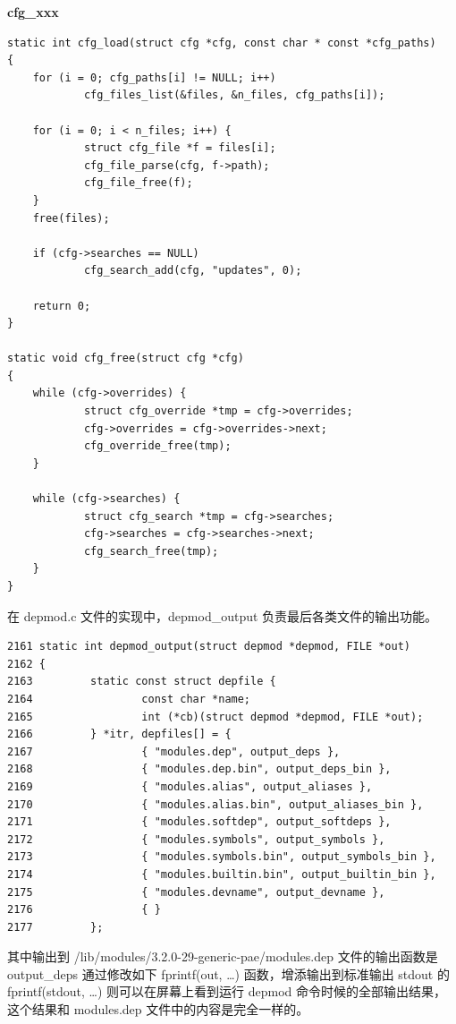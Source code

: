 \documentclass[11pt,a4paper]{article}
\begin{document}
\textbf{cfg\_xxx}

{\begin{shaded}\begin{verbatim}
static int cfg_load(struct cfg *cfg, const char * const *cfg_paths)
{
    for (i = 0; cfg_paths[i] != NULL; i++)
            cfg_files_list(&files, &n_files, cfg_paths[i]);

    for (i = 0; i < n_files; i++) {
            struct cfg_file *f = files[i];
            cfg_file_parse(cfg, f->path);
            cfg_file_free(f);
    }
    free(files);

    if (cfg->searches == NULL)
            cfg_search_add(cfg, "updates", 0);

    return 0;
}

static void cfg_free(struct cfg *cfg)
{
    while (cfg->overrides) {
            struct cfg_override *tmp = cfg->overrides;
            cfg->overrides = cfg->overrides->next;
            cfg_override_free(tmp);
    }

    while (cfg->searches) {
            struct cfg_search *tmp = cfg->searches;
            cfg->searches = cfg->searches->next;
            cfg_search_free(tmp);
    }
}
\end{verbatim}\end{shaded}}
在 depmod.c 文件的实现中，depmod\_output 负责最后各类文件的输出功能。

{\begin{shaded}\begin{verbatim}
2161 static int depmod_output(struct depmod *depmod, FILE *out)
2162 {
2163         static const struct depfile {
2164                 const char *name;
2165                 int (*cb)(struct depmod *depmod, FILE *out);
2166         } *itr, depfiles[] = {
2167                 { "modules.dep", output_deps },
2168                 { "modules.dep.bin", output_deps_bin },
2169                 { "modules.alias", output_aliases },
2170                 { "modules.alias.bin", output_aliases_bin },
2171                 { "modules.softdep", output_softdeps },
2172                 { "modules.symbols", output_symbols },
2173                 { "modules.symbols.bin", output_symbols_bin },
2174                 { "modules.builtin.bin", output_builtin_bin },
2175                 { "modules.devname", output_devname },
2176                 { }
2177         };
\end{verbatim}\end{shaded}}
其中输出到 /lib/modules/3.2.0-29-generic-pae/modules.dep
文件的输出函数是 output\_deps 通过修改如下 fprintf(out, \ldots{})
函数，增添输出到标准输出 stdout 的 fprintf(stdout, \ldots{})
则可以在屏幕上看到运行 depmod 命令时候的全部输出结果，这个结果和
modules.dep 文件中的内容是完全一样的。
\end{document}
